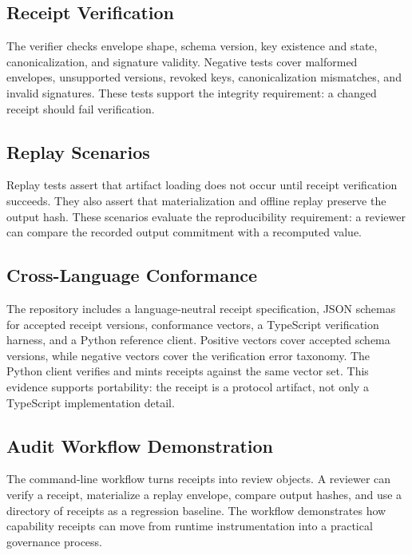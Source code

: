 \documentclass[conference]{IEEEtran}
\begin{document}
\subsection{Receipt Verification}

The verifier checks envelope shape, schema version, key existence and state,
canonicalization, and signature validity. Negative tests cover malformed
envelopes, unsupported versions, revoked keys, canonicalization mismatches, and
invalid signatures. These tests support the integrity requirement: a changed
receipt should fail verification.

\subsection{Replay Scenarios}

Replay tests assert that artifact loading does not occur until receipt
verification succeeds. They also assert that materialization and offline replay
preserve the output hash. These scenarios evaluate the reproducibility
requirement: a reviewer can compare the recorded output commitment with a
recomputed value.

\subsection{Cross-Language Conformance}

The repository includes a language-neutral receipt specification, JSON schemas
for accepted receipt versions, conformance vectors, a TypeScript verification
harness, and a Python reference client. Positive vectors cover accepted schema
versions, while negative vectors cover the verification error taxonomy. The
Python client verifies and mints receipts against the same vector set. This
evidence supports portability: the receipt is a protocol artifact, not only a
TypeScript implementation detail.

\subsection{Audit Workflow Demonstration}

The command-line workflow turns receipts into review objects. A reviewer can
verify a receipt, materialize a replay envelope, compare output hashes, and use a
directory of receipts as a regression baseline. The workflow demonstrates how
capability receipts can move from runtime instrumentation into a practical
governance process.
\end{document}
